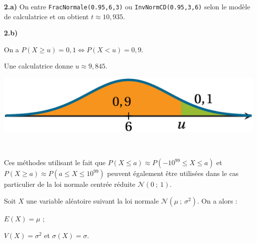 \documentclass{cornouaille}
\begin{document}
\begin{methode}
\textbf{2.a) } On entre \verb"FracNormale(0.95,6,3)" ou
\verb"InvNormCD(0.95,3,6)" selon le modèle de calculatrice et on obtient $t\approx 10,935$.



\textbf{2.b) }~~


\begin{minipage}{0.6\linewidth}
On a $P(X\geqslant u)=0,1 \Leftrightarrow P(X<u)=0,9$.

Une calculatrice donne $u\approx 9,845$.
\end{minipage}

\hfill

\begin{minipage}{0.4\linewidth}



\includegraphics{./TS-Variables-13}



\end{minipage}










~~

\end{methode}



\begin{remarque} Ces méthodes utilisant le fait que $P(X\leqslant a)\approx P(-10^{99}\leqslant X\leqslant a)$ et\linebreak $P(X\geqslant a)\approx P(a\leqslant X\leqslant 10^{99})$  peuvent également être utilisées dans le cas particulier de la loi normale centrée réduite $\mathcal{N}(0\ ;\ 1)$.
\end{remarque}







\begin{propriete}
Soit $X$ une variable aléatoire suivant la loi normale $\mathcal{N}(\mu\ ;\ \sigma^2)$. On a alors :

\begin{colitemize}{2}
\item $E(X)=\mu$ ;
\item $V(X)=\sigma^2$ et $\sigma(X)=\sigma$.
\end{colitemize}


\end{propriete}
\end{document}
